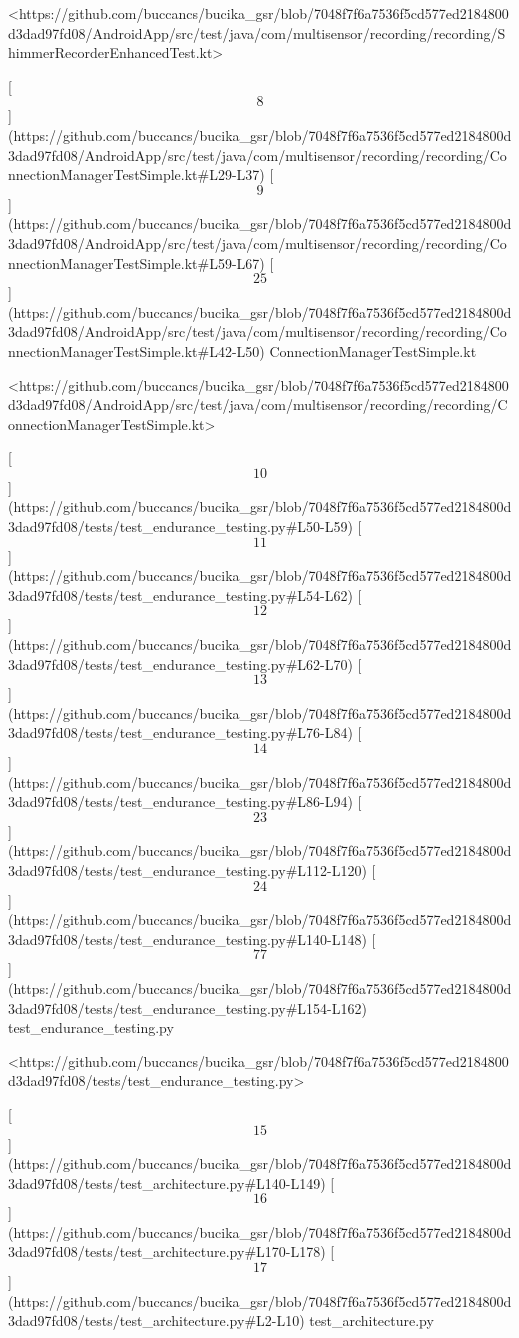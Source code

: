 \documentclass[12pt,a4paper]{article}
\begin{document}
{<https://github.com/buccancs/bucika_gsr/blob/7048f7f6a7536f5cd577ed2184800d3dad97fd08/AndroidApp/src/test/java/com/multisensor/recording/recording/ShimmerRecorderEnhancedTest.kt>

[\[8\]](https://github.com/buccancs/bucika_gsr/blob/7048f7f6a7536f5cd577ed2184800d3dad97fd08/AndroidApp/src/test/java/com/multisensor/recording/recording/ConnectionManagerTestSimple.kt#L29-L37)
[\[9\]](https://github.com/buccancs/bucika_gsr/blob/7048f7f6a7536f5cd577ed2184800d3dad97fd08/AndroidApp/src/test/java/com/multisensor/recording/recording/ConnectionManagerTestSimple.kt#L59-L67)
[\[25\]](https://github.com/buccancs/bucika_gsr/blob/7048f7f6a7536f5cd577ed2184800d3dad97fd08/AndroidApp/src/test/java/com/multisensor/recording/recording/ConnectionManagerTestSimple.kt#L42-L50)
ConnectionManagerTestSimple.kt

<https://github.com/buccancs/bucika_gsr/blob/7048f7f6a7536f5cd577ed2184800d3dad97fd08/AndroidApp/src/test/java/com/multisensor/recording/recording/ConnectionManagerTestSimple.kt>

[\[10\]](https://github.com/buccancs/bucika_gsr/blob/7048f7f6a7536f5cd577ed2184800d3dad97fd08/tests/test_endurance_testing.py#L50-L59)
[\[11\]](https://github.com/buccancs/bucika_gsr/blob/7048f7f6a7536f5cd577ed2184800d3dad97fd08/tests/test_endurance_testing.py#L54-L62)
[\[12\]](https://github.com/buccancs/bucika_gsr/blob/7048f7f6a7536f5cd577ed2184800d3dad97fd08/tests/test_endurance_testing.py#L62-L70)
[\[13\]](https://github.com/buccancs/bucika_gsr/blob/7048f7f6a7536f5cd577ed2184800d3dad97fd08/tests/test_endurance_testing.py#L76-L84)
[\[14\]](https://github.com/buccancs/bucika_gsr/blob/7048f7f6a7536f5cd577ed2184800d3dad97fd08/tests/test_endurance_testing.py#L86-L94)
[\[23\]](https://github.com/buccancs/bucika_gsr/blob/7048f7f6a7536f5cd577ed2184800d3dad97fd08/tests/test_endurance_testing.py#L112-L120)
[\[24\]](https://github.com/buccancs/bucika_gsr/blob/7048f7f6a7536f5cd577ed2184800d3dad97fd08/tests/test_endurance_testing.py#L140-L148)
[\[77\]](https://github.com/buccancs/bucika_gsr/blob/7048f7f6a7536f5cd577ed2184800d3dad97fd08/tests/test_endurance_testing.py#L154-L162)
test_endurance_testing.py

<https://github.com/buccancs/bucika_gsr/blob/7048f7f6a7536f5cd577ed2184800d3dad97fd08/tests/test_endurance_testing.py>

[\[15\]](https://github.com/buccancs/bucika_gsr/blob/7048f7f6a7536f5cd577ed2184800d3dad97fd08/tests/test_architecture.py#L140-L149)
[\[16\]](https://github.com/buccancs/bucika_gsr/blob/7048f7f6a7536f5cd577ed2184800d3dad97fd08/tests/test_architecture.py#L170-L178)
[\[17\]](https://github.com/buccancs/bucika_gsr/blob/7048f7f6a7536f5cd577ed2184800d3dad97fd08/tests/test_architecture.py#L2-L10)
test_architecture.py

}
\end{document}
